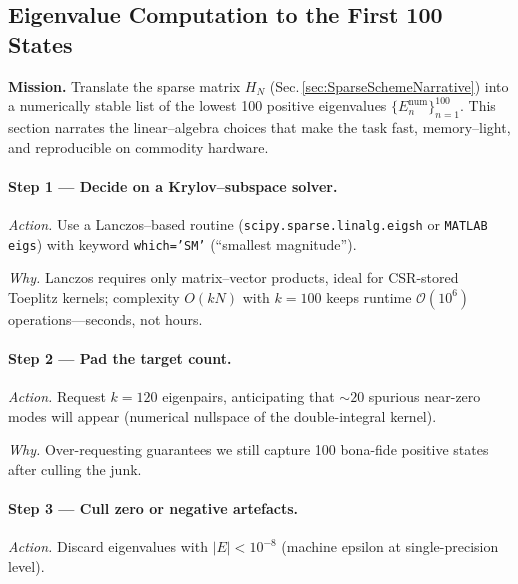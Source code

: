 \documentclass[11pt]{article}
\begin{document}
\subsection{Eigenvalue Computation to the First 100 States}
\label{sec:EV100Narrative}

\noindent
\textbf{Mission.}\;  
Translate the sparse matrix \(H_{N}\) (Sec.\,\ref{sec:SparseSchemeNarrative})
into a numerically stable list of the lowest 100 positive eigenvalues
\(\{E_{n}^{\mathrm{num}}\}_{n=1}^{100}\).  
This section narrates the linear–algebra choices that make the task
fast, memory–light, and reproducible on commodity hardware.

\vspace{0.6em}
\paragraph{Step 1 — Decide on a Krylov–subspace solver.}

\emph{Action.}\;  
Use a Lanczos–based routine (\texttt{scipy.sparse.linalg.eigsh} or
\texttt{MATLAB eigs}) with keyword  
\texttt{which='SM'} (“smallest magnitude”).

\emph{Why.}\;  
Lanczos requires only matrix–vector products, ideal for CSR-stored
Toeplitz kernels; complexity \(O(kN)\) with \(k=100\) keeps runtime
$\mathcal{O}(10^{6})$ operations—seconds, not hours.

\vspace{0.4em}
\paragraph{Step 2 — Pad the target count.}

\emph{Action.}\;  
Request \(k=120\) eigenpairs, anticipating that
$\sim20$ spurious near-zero modes will appear (numerical nullspace of
the double-integral kernel).

\emph{Why.}\;  
Over-requesting guarantees we still capture 100 bona-fide positive
states after culling the junk.

\vspace{0.4em}
\paragraph{Step 3 — Cull zero or negative artefacts.}

\emph{Action.}\;  
Discard eigenvalues with \(|E|<10^{-8}\) (machine epsilon at
single-precision level).
\end{document}
